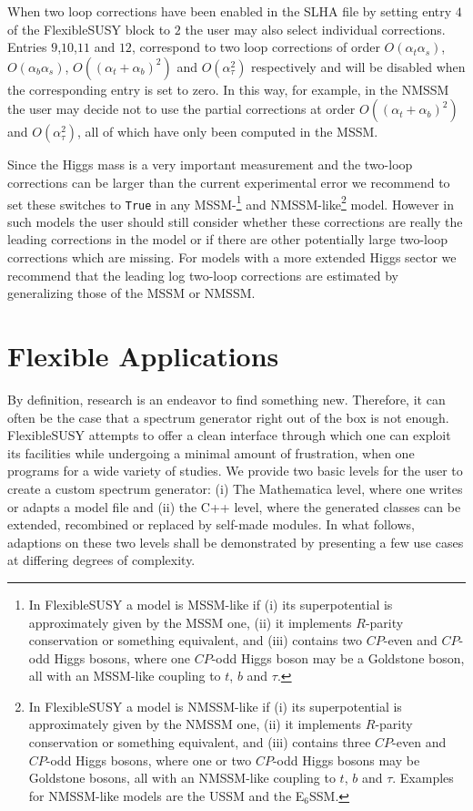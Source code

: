 \documentclass[final,3p,11pt,pdflatex]{elsarticle}
\makeatletter
\newcommand{\fs}{FlexibleSUSY\@\xspace}
\newcommand{\mathematica}{Mathematica\xspace}
\newcommand{\ESSM}{E$_6$SSM\@\xspace}
\newcommand{\code}[1]{\lstinline|#1|}  %
\def\at{\alpha_t}
\def\ab{\alpha_b}
\def\as{\alpha_s}
\def\atau{\alpha_{\tau}}
\def\oatas{O(\at\as)}
\def\oabas{O(\ab\as)}
\def\oatauq{O(\atau^2)}
\def\oatplusabsq{O((\at+\ab)^2)}
\makeatother
\begin{document}
  When two loop corrections have been enabled in the SLHA
  file by setting entry $4$ of the FlexibleSUSY block to $2$ the user may
  also select individual corrections. Entries $9$,$10$,$11$ and $12$,
  correspond to two loop corrections of order $\oatas$, $\oabas$,
  $\oatplusabsq$ and $\oatauq$ respectively and will be disabled when
  the corresponding entry is set to zero. In this way, for example, in
  the NMSSM the user may decide not to use the partial corrections at
  order $\oatplusabsq$ and $\oatauq$, all of which have
  only been computed in the MSSM. 

Since the Higgs mass is a very important measurement and the two-loop
corrections can be larger than the current experimental error
\cite{Degrassi:2009yq} we recommend to set these switches to
\code{True} in any MSSM-\footnote{In \fs a model is MSSM-like if (i)
  its superpotential is approximately given by the MSSM one, (ii) it
  implements $R$-parity conservation or something equivalent, and
  (iii) contains two $CP$-even and $CP$-odd Higgs bosons, where one $CP$-odd
  Higgs boson may be a Goldstone boson, all with an MSSM-like coupling
  to $t$, $b$ and $\tau$.} and NMSSM-like\footnote{In \fs a model is
  NMSSM-like if (i) its superpotential is approximately given by the
  NMSSM one, (ii) it implements $R$-parity conservation or something
  equivalent, and (iii) contains three $CP$-even and $CP$-odd Higgs
  bosons, where one or two $CP$-odd Higgs bosons may be Goldstone
  bosons, all with an NMSSM-like coupling to $t$, $b$ and $\tau$\@.
  Examples for NMSSM-like models are the USSM and the \ESSM.} model.
However in such models the user should still consider whether these
corrections are really the leading corrections in the model or if
there are other potentially large two-loop corrections which are
missing.  For models with a more extended Higgs sector we recommend
that the leading log two-loop corrections are estimated by
generalizing those of the MSSM or NMSSM.

\section{Flexible Applications}
\label{sec:Flexible}

By definition, research is an endeavor to find something new.
Therefore, it can often be the case that
a spectrum generator right out of the box is not enough.
\fs attempts to offer a clean interface through which
one can exploit its facilities
while undergoing a minimal amount of frustration,
when one programs for a wide variety of studies.
We provide two basic levels for the user to create a custom spectrum
generator: (i) The \mathematica level, where one writes or
adapts a model file and (ii) the C++ level, where the generated
classes can be extended, recombined or replaced by self-made modules.
In what follows, adaptions on these two levels shall be demonstrated
by presenting a few use cases at differing degrees of complexity.
\end{document}
